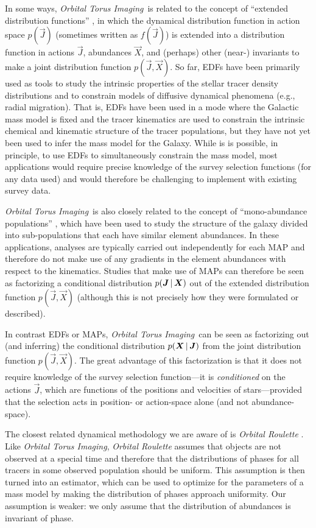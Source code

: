 \documentclass[modern]{aastex63}
\newcommand{\methodname}{\textsl{Orbital Torus Imaging}}
\begin{document}
In some ways, \methodname\ is related to the concept of ``extended distribution
functions'' \citep[EDFs; e.g.,][]{Sanders:2015,Das:2016}, in which the dynamical
distribution function in action space $p(\vec{J})$ (sometimes written as
$f(\vec{J})$) is extended into a distribution function in actions $\vec{J}$,
abundances $\vec{X}$, and (perhaps) other (near-) invariants to make a joint
distribution function $p(\vec{J},\vec{X})$.
So far, EDFs have been primarily used as tools to study the intrinsic properties
of the stellar tracer density distributions and to constrain models of diffusive
dynamical phenomena (e.g., radial migration).
That is, EDFs have been used in a mode where the Galactic mass model is fixed
and the tracer kinematics are used to constrain the intrinsic chemical and
kinematic structure of the tracer populations, but they have not yet been used
to infer the mass model for the Galaxy.
While is is possible, in principle, to use EDFs to simultaneously constrain the
mass model, most applications would require precise knowledge of the survey
selection functions (for any data used) and would therefore be challenging to
implement with existing survey data.

\methodname\ is also closely related to the concept of ``mono-abundance
populations'' \citep[MAPs; e.g.,][]{Bovy:2012, Bovy:2013, Bovy:2016,
Mackereth:2020}, which have been used to study the structure of the galaxy
divided into sub-populations that each have similar element abundances.
In these applications, analyses are typically carried out independently for each
MAP and therefore do not make use of any gradients in the element abundances
with respect to the kinematics.
Studies that make use of MAPs can therefore be seen as factorizing a conditional
distribution $p(\boldsymbol{J}\,|\,\boldsymbol{X})$ out of the extended distribution function
$p(\vec{J},\vec{X})$ (although this is not precisely how they were formulated or
described).

In contrast EDFs or MAPs, \methodname\ can be seen as factorizing out (and
inferring) the conditional distribution $p(\boldsymbol{X}\,|\,\boldsymbol{J})$ from the joint
distribution function $p(\vec{J}, \vec{X})$.
The great advantage of this factorization is that it does not require knowledge
of the survey selection function---it is \emph{conditioned} on the actions
$\vec{J}$, which are functions of the positions and velocities of
stars---provided that the selection acts in position- or action-space alone (and
not abundance-space).

The closest related dynamical methodology we are aware of is \textit{Orbital
Roulette} \citep{Beloborodov:2004}.
Like \methodname, \textit{Orbital Roulette} assumes that objects are not
observed at a special time and therefore that the distributions of phases for
all tracers in some observed population should be uniform.
This assumption is then turned into an estimator, which can be used to optimize
for the parameters of a mass model by making the distribution of phases approach
uniformity.
Our assumption is weaker: we only assume that the distribution of abundances is
invariant of phase.
\end{document}
